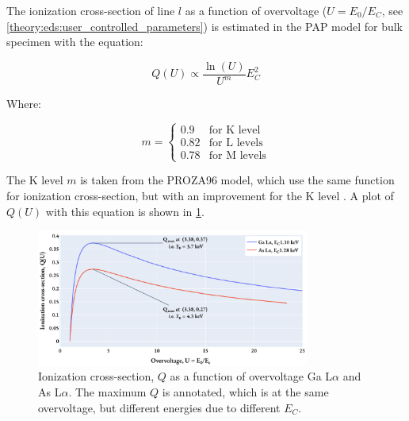 The ionization cross-section of line $l$ as a function of overvoltage ($U = E_0/E_C$, see \cref{theory:eds:user_controlled_parameters}) is estimated in the PAP model for bulk specimen with the equation:

\begin{equation}
    Q(U) \propto \frac{\ln(U)}{U^m} E_C^2
\end{equation}

Where:

\begin{equation}
    m = \begin{cases}
        0.9  & \text{for K level}  \\
        0.82 & \text{for L levels} \\
        0.78 & \text{for M levels}
    \end{cases}
\end{equation}

The K level $m$ is taken from the PROZA96 model, which use the same function for ionization cross-section, but with an improvement for the K level \cite{bastin_proza96_1998}.
A plot of $Q(U)$ with this equation is shown in \cref{fig:PAP:ionization_cross_section}.



\begin{figure}[htbp]
    \centering
    \includegraphics[width=0.8\textwidth]{figures/PAP_ionization_cross_section.pdf}
    \caption{
        Ionization cross-section, $Q$ as a function of overvoltage Ga L$\alpha$ and As L$\alpha$.
        The maximum $Q$ is annotated, which is at the same overvoltage, but different energies due to different $E_C$.
    }
    \label{fig:PAP:ionization_cross_section}
\end{figure}



